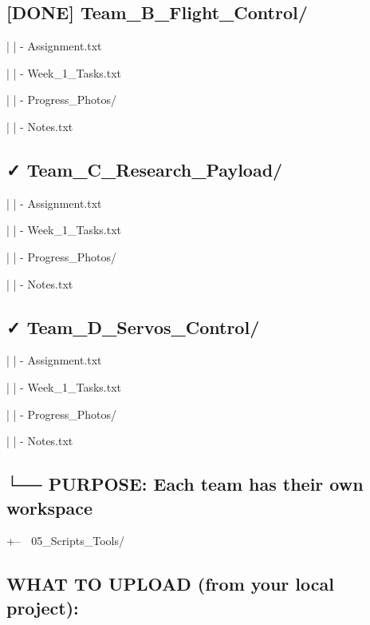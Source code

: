 \documentclass[11pt,letterpaper]{article}
\begin{document}
{{{{\subsection*{[DONE] Team\_B\_Flight\_Control/}

|   |       - Assignment.txt\par

|   |       - Week\_1\_Tasks.txt\par

|   |       - Progress\_Photos/\par

|   |       - Notes.txt\par

\subsection*{✓ Team_C_Research_Payload/}

|   |       - Assignment.txt\par

|   |       - Week\_1\_Tasks.txt\par

|   |       - Progress\_Photos/\par

|   |       - Notes.txt\par

\subsection*{✓ Team_D_Servos_Control/}

|   |       - Assignment.txt\par

|   |       - Week\_1\_Tasks.txt\par

|   |       - Progress\_Photos/\par

|   |       - Notes.txt\par

\subsection*{└── PURPOSE: Each team has their own workspace}

+-- 📁 05\_Scripts\_Tools/\par

\subsection*{WHAT TO UPLOAD (from your local project):}

}}}}
\end{document}
